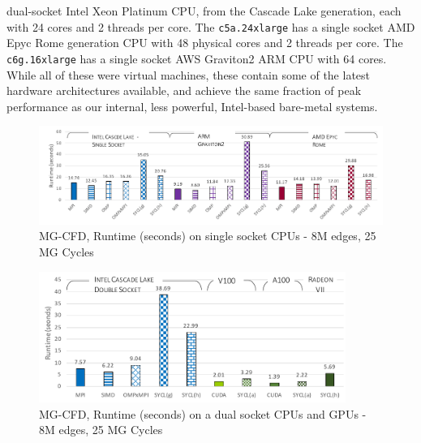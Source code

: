 \documentclass[runningheads]{llncs}
\begin{document}
dual-socket Intel Xeon Platinum CPU, from the Cascade Lake generation, each with 
24 cores and 2 threads per core. The \texttt{c5a.24xlarge} has a single socket 
AMD Epyc Rome generation CPU with 48 physical cores and 2 threads per core. The 
\texttt{c6g.16xlarge} has a single socket AWS Graviton2 ARM CPU with 64 cores. 
While all of these were virtual machines, these contain some of the latest 
hardware architectures available, and achieve the same fraction of peak 
performance as our internal, less powerful, Intel-based bare-metal systems.

\begin{figure}[t]
\centering
\includegraphics[width=12.5cm]{figures/SingleNode1SKTPerf}\vspace{-0pt}
\vspace{-22pt}\caption{MG-CFD, Runtime (seconds) on single socket CPUs - 8M 
edges, 25 MG Cycles }
\label{graph/perf}\vspace{-5pt}
\end{figure}

\begin{figure}[t]
\centering
\includegraphics[width=10cm]{figures/SingleNode2SKTPerf}
\vspace{-10pt}\caption{MG-CFD, Runtime (seconds) on a dual socket CPUs and GPUs 
- 8M edges, 25 MG Cycles }
\label{graph/perf2}\vspace{-15pt}
\end{figure}
\end{document}
